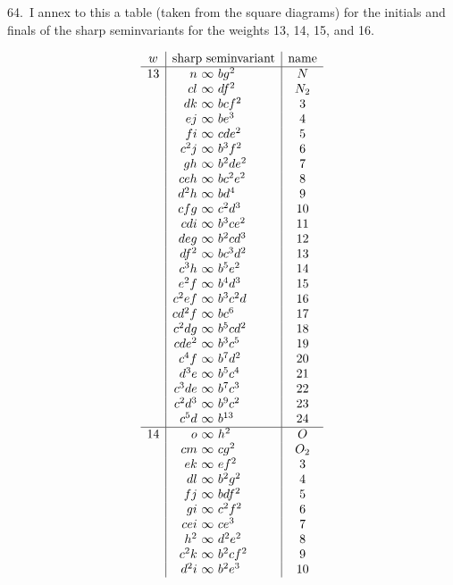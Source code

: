 \documentclass[11pt]{article}
\begin{document}
64.\ I annex to this a table (taken from the square diagrams) for the initials and finals of the sharp seminvariants for the weights 13, 14, 15, and 16.

\clearpage
\begingroup
\scriptsize
\setlength{\arraycolsep}{2pt}
\[
\begin{array}{c|r@{\ }c@{\ }l|c}
w&\multicolumn{3}{c|}{\hbox{sharp seminvariant}}&\hbox{name}\\ \hline
13&n&\infty&bg^2&N\\
&cl&\infty&df^2&N_2\\
&dk&\infty&bcf^2&3\\
&ej&\infty&be^3&4\\
&fi&\infty&cde^2&5\\
&c^2j&\infty&b^3f^2&6\\
&gh&\infty&b^2de^2&7\\
&ceh&\infty&bc^2e^2&8\\
&d^2h&\infty&bd^4&9\\
&cfg&\infty&c^2d^3&10\\
&cdi&\infty&b^3ce^2&11\\
&deg&\infty&b^2cd^3&12\\
&df^2&\infty&bc^3d^2&13\\
&c^3h&\infty&b^5e^2&14\\
&e^2f&\infty&b^4d^3&15\\
&c^2ef&\infty&b^3c^2d&16\\
&cd^2f&\infty&bc^6&17\\
&c^2dg&\infty&b^5cd^2&18\\
&cde^2&\infty&b^3c^5&19\\
&c^4f&\infty&b^7d^2&20\\
&d^3e&\infty&b^5c^4&21\\
&c^3de&\infty&b^7c^3&22\\
&c^2d^3&\infty&b^9c^2&23\\
&c^5d&\infty&b^{13}&24\\ \hline
14&o&\infty&h^2&O\\
&cm&\infty&cg^2&O_2\\
&ek&\infty&ef^2&3\\
&dl&\infty&b^2g^2&4\\
&fj&\infty&bdf^2&5\\
&gi&\infty&c^2f^2&6\\
&cei&\infty&ce^3&7\\
&h^2&\infty&d^2e^2&8\\
&c^2k&\infty&b^2cf^2&9\\
&d^2i&\infty&b^2e^3&10\\

\end{array}\]
\end{document}

